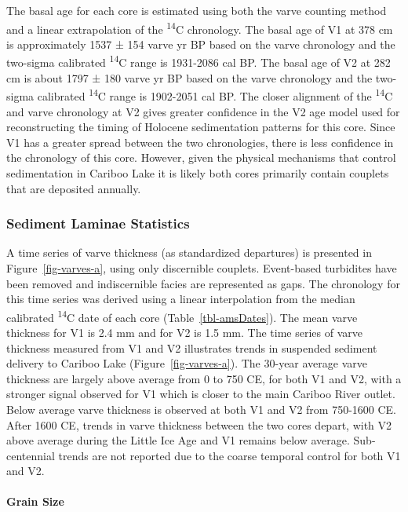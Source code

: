 \documentclass[
  letterpaper,
  DIV=11,
  numbers=noendperiod]{scrartcl}
\let\oldparagraph\paragraph
\renewcommand{\paragraph}[1]{\oldparagraph{#1}\mbox{}}
\begin{document}
The basal age for each core is estimated using both the varve counting
method and a linear extrapolation of the \textsuperscript{14}C
chronology. The basal age of V1 at 378 cm is approximately 1537 ± 154
varve yr BP based on the varve chronology and the two-sigma calibrated
\textsuperscript{14}C range is 1931-2086 cal BP. The basal age of V2 at
282 cm is about 1797 ± 180 varve yr BP based on the varve chronology and
the two-sigma calibrated \textsuperscript{14}C range is 1902-2051 cal
BP. The closer alignment of the \textsuperscript{14}C and varve
chronology at V2 gives greater confidence in the V2 age model used for
reconstructing the timing of Holocene sedimentation patterns for this
core. Since V1 has a greater spread between the two chronologies, there
is less confidence in the chronology of this core. However, given the
physical mechanisms that control sedimentation in Cariboo Lake it is
likely both cores primarily contain couplets that are deposited
annually.

\hypertarget{sediment-laminae-statistics}{%
\subsubsection{Sediment Laminae
Statistics}\label{sediment-laminae-statistics}}

A time series of varve thickness (as standardized departures) is
presented in Figure~\ref{fig-varves-a}, using only discernible couplets.
Event-based turbidites have been removed and indiscernible facies are
represented as gaps. The chronology for this time series was derived
using a linear interpolation from the median calibrated
\textsuperscript{14}C date of each core (Table~\ref{tbl-amsDates}). The
mean varve thickness for V1 is 2.4 mm and for V2 is 1.5 mm. The time
series of varve thickness measured from V1 and V2 illustrates trends in
suspended sediment delivery to Cariboo Lake (Figure~\ref{fig-varves-a}).
The 30-year average varve thickness are largely above average from 0 to
750 CE, for both V1 and V2, with a stronger signal observed for V1 which
is closer to the main Cariboo River outlet. Below average varve
thickness is observed at both V1 and V2 from 750-1600 CE. After 1600 CE,
trends in varve thickness between the two cores depart, with V2 above
average during the Little Ice Age and V1 remains below average.
Sub-centennial trends are not reported due to the coarse temporal
control for both V1 and V2.

\hypertarget{grain-size}{%
\paragraph{Grain Size}\label{grain-size}}
\end{document}
